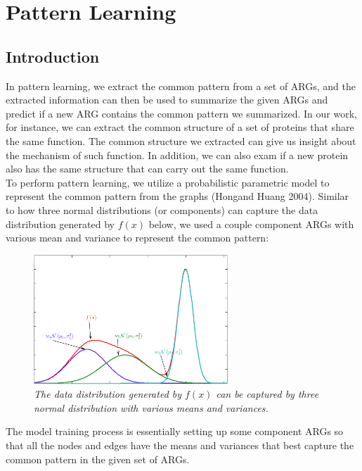 \chapter{Pattern Learning}

\section{Introduction}

In pattern learning, we extract the common pattern from a set of ARGs, and the extracted information can then be used to summarize the given ARGs and predict if a new ARG contains the common pattern we summarized. In our work, for instance, we can extract the common structure of a set of proteins that share the same function. The common structure we extracted can give us insight about the mechanism of such function. In addition, we can also exam if a new protein also has the same structure that can carry out the same function.\\

To perform pattern learning, we utilize a probabilistic parametric model to represent the common pattern from the graphs (Hong\footnotemark and Huang 2004). Similar to how three normal distributions (or components) can capture the data distribution generated by $f(x)$ below, we used a couple component ARGs with various mean and variance to represent the common pattern:

\begin{figure}[h]
	\centering
	\captionsetup{justification=centering}
	\includegraphics[width=0.65\textwidth]{figs/mixture.png}
	\caption[Caption for LOF]{\emph{The data distribution generated by $f(x)$ can be captured by three normal distribution with various means and variances.}}
	\label{fig:mixture}
\end{figure}

The model training process is essentially setting up some component ARGs so that all the nodes and edges have the means and variances that best capture the common pattern in the given set of ARGs.\\

